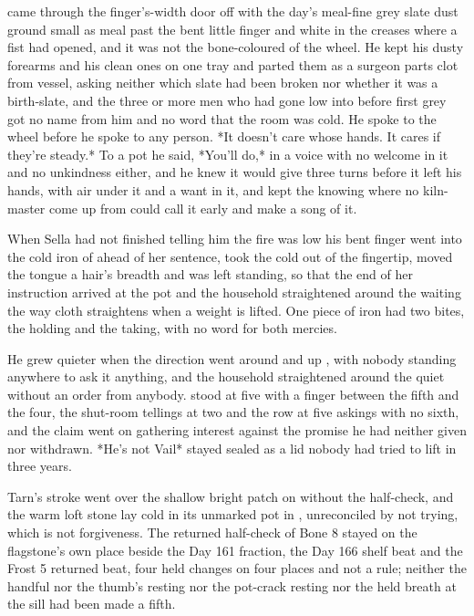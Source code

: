  came through the finger's-width door off  with the day's meal-fine grey slate dust ground small as meal past the bent little finger and white in the creases where a fist had opened, and it was not the bone-coloured  of the wheel. He kept his dusty forearms and his clean ones on one tray and parted them as a surgeon parts clot from vessel, asking neither which slate had been broken nor whether it was a birth-slate, and the three or more men who had gone low into  before first grey got no name from him and no word that the room was cold. He spoke to the wheel before he spoke to any person. *It doesn't care whose hands. It cares if they're steady.* To a pot he said, *You'll do,* in a voice with no welcome in it and no unkindness either, and he knew  it would give three turns before it left his hands, with air under it and a want in it, and kept the knowing where no kiln-master come up from  could call it early and make a song of it.

When Sella had not finished telling him the fire was low his bent finger went into the cold iron of  ahead of her sentence, took the cold out of the fingertip, moved the tongue a hair's breadth and was left standing, so that the end of her instruction arrived at the pot and the household straightened around the waiting the way cloth straightens when a weight is lifted. One piece of iron had two bites, the holding and the taking, with no  word for both mercies.

He grew quieter when the direction went around  and up , with nobody standing anywhere to ask it anything, and the household straightened around the quiet without an order from anybody.  stood at five with a finger between the fifth and the four, the shut-room tellings at two and the row at five askings with no sixth, and the claim went on gathering interest against the promise he had neither given nor withdrawn. *He's not Vail* stayed sealed as a lid nobody had tried to lift in three years.

Tarn's stroke went over the shallow bright patch on  without the half-check, and the warm loft stone lay cold in its unmarked pot in , unreconciled by not trying, which is not forgiveness. The returned half-check of Bone 8 stayed on the flagstone's own place beside the Day 161 fraction, the Day 166 shelf beat and the Frost 5 returned beat, four held changes on four places and not a rule; neither the handful nor the thumb's resting nor the pot-crack resting nor the held breath at the sill had been made a fifth.

